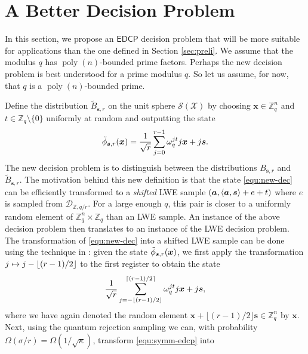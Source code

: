 \documentclass[11pt]{article}
\theoremstyle{plain}
\theoremstyle{definition}
\DeclareMathOperator{\poly}{poly}
\let\ket\relax
\DeclarePairedDelimiter{\ket}{\lvert}{\rangle}
\DeclarePairedDelimiter{\lrang}{\langle}{\rangle}
\def\Z{\mathbb{Z}}
\def\edcp{\mathsf{EDCP}}
\begin{document}



\section{A Better Decision Problem}

In this section, we propose an $\edcp$ decision problem that will be more suitable for applications than the one defined in Section \ref{sec:preli}. We assume that the modulus $q$ has $\poly(n)$-bounded prime factors. Perhaps the new decision problem is best understood for a prime modulus $q$. So let us assume, for now, that $q$ is a $\poly(n)$-bounded prime. 

Define the distribution $\tilde{B}_{\bm{s}, r}$ on the unit sphere $\mathcal{S(X)}$ by choosing $\bm{x} \in \Z_q^n$ and $t \in \Z_q {\setminus} \{ 0 \}$ uniformly at random and outputting the state
\begin{equation}
    \label{equ:new-dec}
    \ket{\tilde{\phi}_{\bm{s}, r}(\bm{x})} = \frac{1}{\sqrt{r}} \sum_{j = 0}^{r - 1} \omega_q^{jt} \ket{j}\ket{\bm{x} + j\bm{s}}.
\end{equation}
The new decision problem is to distinguish between the distributions $B_{\bm{s}, r}$ and $\tilde{B}_{\bm{s}, r}$. The motivation behind this new definition is that the state \eqref{equ:new-dec} can be efficiently transformed to a \textit{shifted} LWE sample $(\bm{a}, \lrang{\bm{a}, \bm{s}} + e + t)$ where $e$ is sampled from $\mathcal{D}_{\Z, q / r}$. For a large enough $q$, this pair is closer to a uniformly random element of $\Z_q^n \times \Z_q$ than an LWE sample. An instance of the above decision problem then translates to an instance of the LWE decision problem. The transformation of \eqref{equ:new-dec} into a shifted LWE sample can be done using the technique in \cite{brakerski2018learning}: given the state $\ket{\tilde{\phi}_{\bm{s}, r}(\bm{x})}$, we first apply the transformation $\ket{j} \mapsto \ket{j - \lfloor (r - 1) / 2 \rfloor}$ to the first register to obtain the state
\begin{equation}
    \label{equ:symm-edcp}
    \frac{1}{\sqrt{r}} \sum_{j = -\lfloor (r - 1) / 2 \rfloor}^{\lceil (r - 1) / 2 \rceil} \omega_q^{jt} \ket{j}\ket{\bm{x} + j\bm{s}},
\end{equation}
where we have again denoted the random element $\bm{x} + \lfloor (r - 1) / 2 \rfloor \bm{s} \in \Z_q^n$ by $\bm{x}$. Next, using the quantum rejection sampling we can, with probability $\Omega(\sigma / r) = \Omega(1 / \sqrt{\kappa})$, transform \eqref{equ:symm-edcp} into 
\end{document}
